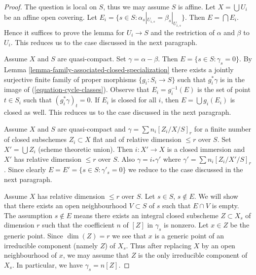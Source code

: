 \documentclass{stacks-project}
\theoremstyle{plain}
\theoremstyle{definition}
\theoremstyle{remark}
\numberwithin{equation}{subsection}
\begin{document}
\begin{proof}
The question is local on $S$, thus we may assume $S$ is affine.
Let $X = \bigcup U_i$ be an affine open covering. Let
$E_i = \{s \in S : \alpha_s|_{U_{i, s}} = \beta_s|_{U_{i, s}}\}$.
Then $E = \bigcap E_i$. Hence it suffices to prove the lemma for
$U_i \to S$ and the restriction of $\alpha$ and $\beta$ to $U_i$.
This reduces us to the case discussed in the next paragraph.

\medskip\noindent
Assume $X$ and $S$ are quasi-compact.
Set $\gamma = \alpha - \beta$. Then $E = \{s \in S : \gamma_s = 0\}$.
By Lemma \ref{lemma-family-associated-closed-specialization}
there exists a jointly surjective finite family of proper morphisms
$\{g_i : S_i \to S\}$ such that $g_i^*\gamma$ is in the image
of (\ref{equation-cycle-classes}). Observe that $E_i = g_i^{-1}(E)$ is
the set of point $t \in S_i$ such that $(g_i^*\gamma)_t = 0$.
If $E_i$ is closed for all $i$, then $E = \bigcup g_i(E_i)$
is closed as well. This reduces us to the case discussed in the next
paragraph.

\medskip\noindent
Assume $X$ and $S$ are quasi-compact and $\gamma = \sum n_i[Z_i/X/S]_r$
for a finite number of closed subschemes $Z_i \subset X$
flat and of relative dimension $\leq r$ over $S$.
Set $X' = \bigcup Z_i$ (scheme theoretic union).
Then $i : X' \to X$ is a closed immersion and $X'$
has relative dimension $\leq r$ over $S$. Also
$\gamma = i_*\gamma'$ where $\gamma' = \sum n_i[Z_i/X'/S]_r$.
Since clearly $E = E' = \{s \in S : \gamma'_s = 0\}$
we reduce to the case discussed in the next paragraph.

\medskip\noindent
Assume $X$ has relative dimension $\leq r$ over $S$.
Let $s \in S$, $s \not \in E$. We will show that there exists an
open neighbourhood $V \subset S$ of $s$ such that $E \cap V$ is empty.
The assumption $s \not \in E$ means there exists an integral closed
subscheme $Z \subset X_s$ of dimension $r$ such that the coefficient
$n$ of $[Z]$ in $\gamma_s$ is nonzero. Let $x \in Z$ be the
generic point. Since $\dim(Z) = r$ we see that $x$ is a generic
point of an irreducible component (namely $Z$) of $X_s$.
Thus after replacing $X$ by an open neighbourhood of $x$,
we may assume that $Z$ is the only irreducible component of $X_s$.
In particular, we have $\gamma_s = n[Z]$.


\end{proof}
\end{document}
